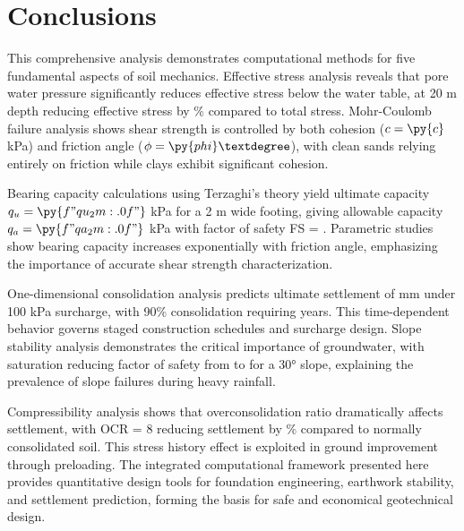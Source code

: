 \documentclass[11pt,a4paper]{article}
\begin{document}
\section{Conclusions}

This comprehensive analysis demonstrates computational methods for five fundamental aspects of soil mechanics. Effective stress analysis reveals that pore water pressure significantly reduces effective stress below the water table, at 20 m depth reducing effective stress by \% compared to total stress. Mohr-Coulomb failure analysis shows shear strength is controlled by both cohesion ($c = \py{c}$ kPa) and friction angle ($\phi = \py{phi}°$), with clean sands relying entirely on friction while clays exhibit significant cohesion.

Bearing capacity calculations using Terzaghi's theory yield ultimate capacity $q_u = \py{f"{qu_2m:.0f}"}$ kPa for a 2 m wide footing, giving allowable capacity $q_a = \py{f"{qa_2m:.0f}"}$ kPa with factor of safety FS = . Parametric studies show bearing capacity increases exponentially with friction angle, emphasizing the importance of accurate shear strength characterization.

One-dimensional consolidation analysis predicts ultimate settlement of  mm under 100 kPa surcharge, with 90\% consolidation requiring  years. This time-dependent behavior governs staged construction schedules and surcharge design. Slope stability analysis demonstrates the critical importance of groundwater, with saturation reducing factor of safety from  to  for a 30° slope, explaining the prevalence of slope failures during heavy rainfall.

Compressibility analysis shows that overconsolidation ratio dramatically affects settlement, with OCR = 8 reducing settlement by \% compared to normally consolidated soil. This stress history effect is exploited in ground improvement through preloading. The integrated computational framework presented here provides quantitative design tools for foundation engineering, earthwork stability, and settlement prediction, forming the basis for safe and economical geotechnical design.
\end{document}
